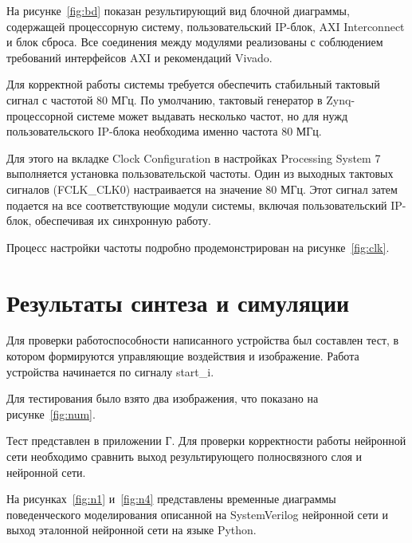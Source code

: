 На рисунке~\ref{fig:bd} показан результирующий вид блочной диаграммы, 
содержащей процессорную систему, пользовательский IP-блок, AXI Interconnect и 
блок сброса. Все соединения между модулями реализованы с соблюдением требований 
интерфейсов AXI и рекомендаций Vivado.


Для корректной работы системы требуется обеспечить стабильный тактовый сигнал с 
частотой 80 МГц. По умолчанию, тактовый генератор в Zynq-процессорной системе 
может выдавать несколько частот, но для нужд пользовательского IP-блока 
необходима именно частота 80 МГц.

Для этого на вкладке Clock Configuration в настройках Processing System 7 
выполняется установка пользовательской частоты. Один из выходных тактовых 
сигналов (FCLK\_CLK0) настраивается на значение 80 МГц. Этот сигнал затем 
подается на все соответствующие модули системы, включая пользовательский 
IP-блок, обеспечивая их синхронную работу.

Процесс настройки частоты подробно продемонстрирован на рисунке~\ref{fig:clk}.



\section{Результаты синтеза и симуляции}
\hspace*{12.5 mm}Для проверки работоспособности написанного устройства был 
составлен тест, в котором формируются управляющие воздействия и изображение. 
Работа устройства начинается по сигналу start\_i. 

Для тестирования было взято два изображения, что показано на 
рисунке~\ref{fig:num}.


Тест представлен в приложении Г. Для проверки корректности работы нейронной 
сети необходимо сравнить выход результирующего полносвязного слоя и нейронной 
сети. 

На рисунках~\ref{fig:n1} и~\ref{fig:n4} представлены временные диаграммы 
поведенческого моделирования описанной на SystemVerilog нейронной сети и выход 
эталонной нейронной сети на языке Python.

